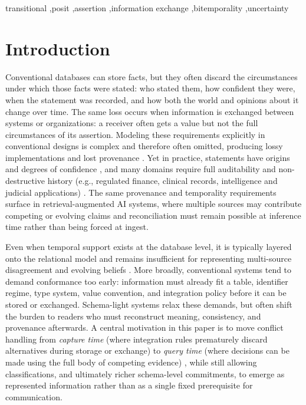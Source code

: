 \documentclass[a4paper,fleqn]{cas-sc}
\begin{document}
\begin{keywords}
transitional \sep posit \sep assertion \sep information exchange \sep bitemporality \sep uncertainty
\end{keywords}

\maketitle

\section{Introduction}
Conventional databases can store facts, but they often discard the circumstances under which those facts were stated: who stated them, how confident they were, when the statement was recorded, and how both the world and opinions about it change over time. The same loss occurs when information is exchanged between systems or organizations: a receiver often gets a value but not the full circumstances of its assertion. Modeling these requirements explicitly in conventional designs is complex and therefore often omitted, producing lossy implementations and lost provenance \cite{GolfarelliRizzi}. Yet in practice, statements have origins and degrees of confidence \cite{Liu}, and many domains require full auditability and non-destructive history (e.g., regulated finance, clinical records, intelligence and judicial applications) \cite{FisherEtAl}. The same provenance and temporality requirements surface in retrieval-augmented AI systems, where multiple sources may contribute competing or evolving claims and reconciliation must remain possible at inference time rather than being forced at ingest.

Even when temporal support exists at the database level, it is typically layered onto the relational model and remains insufficient for representing multi-source disagreement and evolving beliefs \cite{SQL2011,Johnston}. More broadly, conventional systems tend to demand conformance too early: information must already fit a table, identifier regime, type system, value convention, and integration policy before it can be stored or exchanged. Schema-light systems relax these demands, but often shift the burden to readers who must reconstruct meaning, consistency, and provenance afterwards. A central motivation in this paper is to move conflict handling from \emph{capture time} (where integration rules prematurely discard alternatives during storage or exchange) to \emph{query time} (where decisions can be made using the full body of competing evidence) \cite{MassaroEtAl,LinEtAl}, while still allowing classifications, and ultimately richer schema-level commitments, to emerge as represented information rather than as a single fixed prerequisite for communication.
\end{document}

